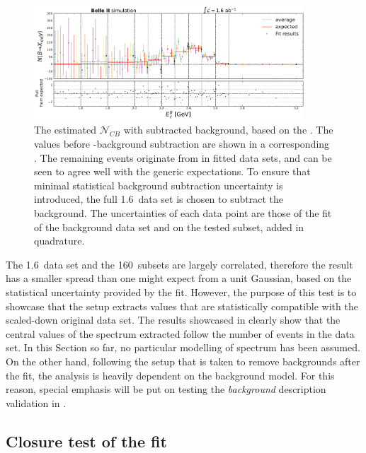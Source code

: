 \begin{figure}[htbp!]
    \includegraphics[width=0.9\textwidth]{figures/mc_validation/subtracted_signal_generic_mc.pdf}
    \caption{\label{fig:subtracted_validation_mc}
    The estimated $\mathcal{N}_{CB}$ with subtracted background, based on the .
    The values before \BB-background subtraction are shown in a corresponding .
    The remaining events originate from \BtoXsgamma in fitted \MC data sets, and can be seen to agree well with the generic \MC expectations.
    To ensure that minimal statistical background subtraction uncertainty is introduced, the full 1.6~\invab data set is chosen to subtract the background.
    The uncertainties of each data point are those of the \Mbc fit of the background data set and on the tested subset, added in quadrature.
    }
\end{figure}

The 1.6~\invab data set and the 160~\invfb subsets are largely correlated, therefore the result has a smaller spread than one might expect from a unit Gaussian, based on the statistical uncertainty provided by the fit.
However, the purpose of this test is to showcase that the setup extracts values that are statistically compatible with the scaled-down original data set.
The results showcased in  clearly show that the central values of the \EB spectrum extracted follow the number of \BtoXsgamma events in the data set.
In this Section so far, no particular modelling of \BtoXsgamma spectrum has been assumed.
On the other hand, following the setup that is taken to remove \BB backgrounds after the \Mbc fit, the analysis is heavily dependent on the background model.
For this reason, special emphasis will be put on testing the \textit{background} description validation in .

\subsection{Closure test of the \texorpdfstring{\Mbc}{Mbc} fit}\label{sec:closure_test}

